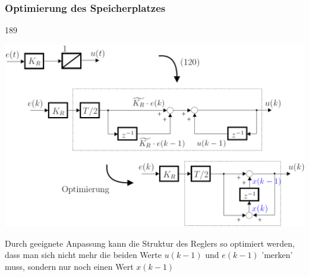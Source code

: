 \subsubsection{Optimierung des Speicherplatzes}{189}

\begin{minipage}[c]{0.6\columnwidth}
     \includegraphics[width=\columnwidth]{images/optimierung_speicherplatz.png}
\end{minipage}
\hfill
\begin{minipage}[c]{0.39\columnwidth}
    Durch geeignete Anpassung kann die Struktur des Reglers so optimiert werden, dass man sich nicht mehr die beiden Werte $u(k-1)$ und $e(k-1)$
    'merken' muss, sondern nur noch einen Wert $x(k-1)$
\end{minipage}

